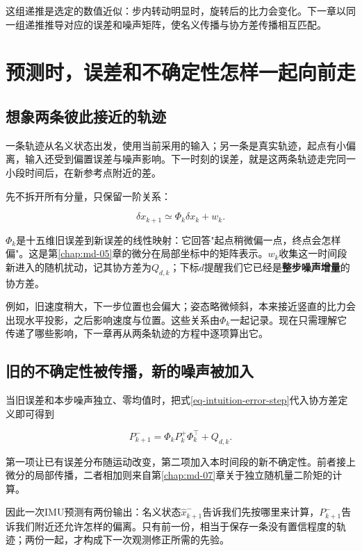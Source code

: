 这组递推是选定的数值近似：步内转动明显时，旋转后的比力会变化。下一章以同一组递推推导对应的误差和噪声矩阵，使名义传播与协方差传播相互匹配。

\section{预测时，误差和不确定性怎样一起向前走}

\subsection{想象两条彼此接近的轨迹}

一条轨迹从名义状态出发，使用当前采用的输入；另一条是真实轨迹，起点有小偏离，输入还受到偏置误差与噪声影响。下一时刻的误差，就是这两条轨迹走完同一小段时间后，在新参考点附近的差。

先不拆开所有分量，只保留一阶关系：

\begin{equation}\label{eq-intuition-error-step}
\boxed{\delta x_{k+1}\simeq\Phi_k\delta x_k+w_k.}
\end{equation}

$\Phi_k$是十五维旧误差到新误差的线性映射：它回答"起点稍微偏一点，终点会怎样偏"。这是第\ref{chap:md-05}章的微分在局部坐标中的矩阵表示。$w_k$收集这一时间段新进入的随机扰动，记其协方差为$Q_{d,k}$；下标$d$提醒我们它已经是\textbf{整步噪声增量}的协方差。

例如，旧速度稍大，下一步位置也会偏大；姿态略微倾斜，本来接近竖直的比力会出现水平投影，之后影响速度与位置。这些关系由$\Phi_k$一起记录。现在只需理解它传递了哪些影响，下一章再从两条轨迹的方程中逐项算出它。

\subsection{旧的不确定性被传播，新的噪声被加入}

当旧误差和本步噪声独立、零均值时，把式\eqref{eq-intuition-error-step}代入协方差定义即可得到

\begin{equation}\label{eq-intuition-p-predict}
\boxed{P_{k+1}^-=\Phi_kP_k^+\Phi_k^\top+Q_{d,k}.}
\end{equation}

第一项让已有误差分布随运动改变，第二项加入本时间段的新不确定性。前者接上微分的局部传播，二者相加则来自第\ref{chap:md-07}章关于独立随机量二阶矩的计算。

因此一次IMU预测有两份输出：名义状态$\hat x_{k+1}^-$告诉我们先按哪里来计算，$P_{k+1}^-$告诉我们附近还允许怎样的偏离。只有前一份，相当于保存一条没有置信程度的轨迹；两份一起，才构成下一次观测修正所需的先验。

